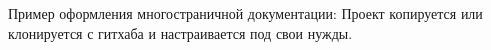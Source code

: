 Пример оформления многостраничной документации\+: Проект копируется или клонируется с гитхаба и настраивается под свои нужды. 